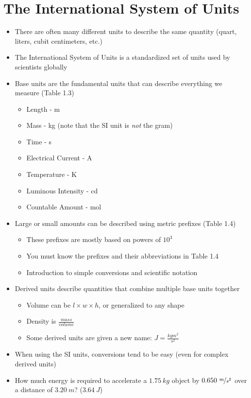 \documentclass[12pt, openany, letterpaper]{memoir}
\begin{document}
\section{The International System of Units}
\begin{itemize}
	\item There are often many different units to describe the same quantity (quart, liters, cubit centimeters, etc.)
	\item The International System of Units is a standardized set of units used by scientists globally
	\item Base units are the fundamental units that can describe everything we measure (Table 1.3)
	\begin{itemize}
		\item Length - m
		\item Mass - kg (note that the SI unit is \emph{not} the gram)
		\item Time - s
		\item Electrical Current - A
		\item Temperature - K
		\item Luminous Intensity - cd
		\item Countable Amount - mol
	\end{itemize}
	\item Large or small amounts can be described using metric prefixes (Table 1.4)
	\begin{itemize}
		\item These prefixes are mostly based on powers of $10^3$
		\item You must know the prefixes and their abbreviations in Table 1.4
		\item Introduction to simple conversions and scientific notation
	\end{itemize}
	\item Derived units describe quantities that combine multiple base units together
	\begin{itemize}
		\item Volume can be $l\times w\times h$, or generalized to any shape
		\item Density is $\frac{mass}{volume}$
		\item Some derived units are given a new name: $J=\frac{kgm^2}{s^2}$
	\end{itemize}
	\item When using the SI units, conversions tend to be easy (even for complex derived units)
	\item How much energy is required to accelerate a $1.75~kg$ object by $0.650~\nicefrac{m}{s^2}$ over a distance of $3.20~m$? ($3.64~J$)
\end{itemize}
\end{document}
